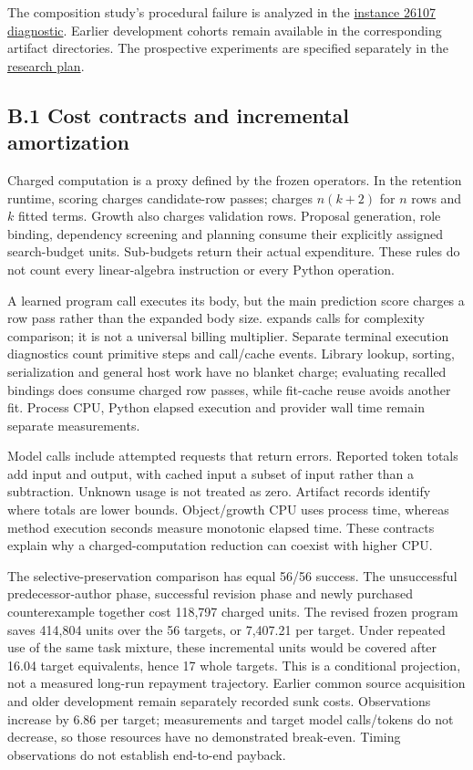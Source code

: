 \documentclass[twoside,11pt]{article}
\begin{document}
The composition study's procedural failure is analyzed in the \hyperlink{artifact-42}{instance 26107 diagnostic}. Earlier development cohorts remain available in the corresponding artifact directories. The prospective experiments are specified separately in the \hyperlink{artifact-43}{research plan}.


\subsection*{B.1 Cost contracts and incremental amortization}

Charged computation is a proxy defined by the frozen operators. In the retention runtime, scoring charges candidate-row passes;  charges \(n(k+2)\) for \(n\) rows and \(k\) fitted terms. Growth also charges validation rows. Proposal generation, role binding, dependency screening and planning consume their explicitly assigned search-budget units. Sub-budgets return their actual expenditure. These rules do not count every linear-algebra instruction or every Python operation.


A learned program call executes its body, but the main prediction score charges a row pass rather than the expanded body size.  expands calls for complexity comparison; it is not a universal billing multiplier. Separate terminal execution diagnostics count primitive steps and call/cache events. Library lookup, sorting, serialization and general host work have no blanket charge; evaluating recalled bindings does consume charged row passes, while fit-cache reuse avoids another fit. Process CPU, Python elapsed execution and provider wall time remain separate measurements.


Model calls include attempted requests that return errors. Reported token totals add input and output, with cached input a subset of input rather than a subtraction. Unknown usage is not treated as zero. Artifact records identify where totals are lower bounds. Object/growth CPU uses process time, whereas method execution seconds measure monotonic elapsed time. These contracts explain why a charged-computation reduction can coexist with higher CPU.


The selective-preservation comparison has equal 56/56 success. The unsuccessful predecessor-author phase, successful revision phase and newly purchased counterexample together cost 118,797 charged units. The revised frozen program saves 414,804 units over the 56 targets, or 7,407.21 per target. Under repeated use of the same task mixture, these incremental units would be covered after 16.04 target equivalents, hence 17 whole targets. This is a conditional projection, not a measured long-run repayment trajectory. Earlier common source acquisition and older development remain separately recorded sunk costs. Observations increase by 6.86 per target; measurements and target model calls/tokens do not decrease, so those resources have no demonstrated break-even. Timing observations do not establish end-to-end payback.
\end{document}
